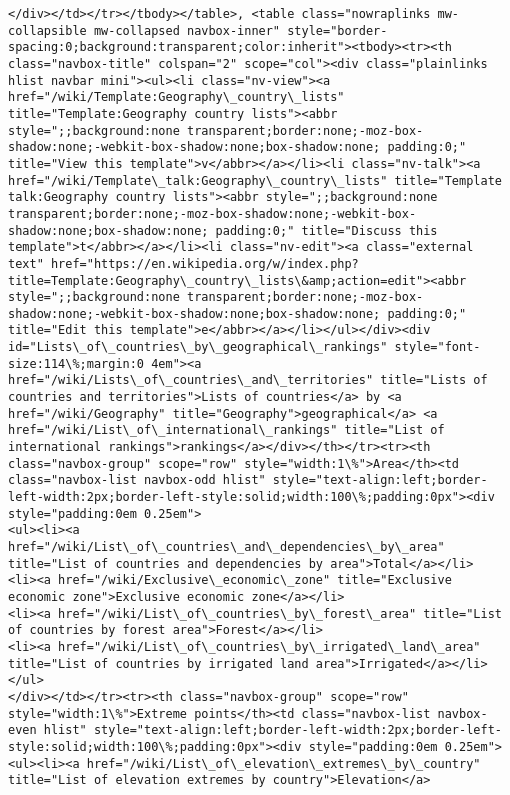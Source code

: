 \documentclass[11pt]{article}
\begin{document}
\begin{Verbatim}[commandchars=\\\{\}]
</div></td></tr></tbody></table>, <table class="nowraplinks mw-collapsible mw-collapsed navbox-inner" style="border-spacing:0;background:transparent;color:inherit"><tbody><tr><th class="navbox-title" colspan="2" scope="col"><div class="plainlinks hlist navbar mini"><ul><li class="nv-view"><a href="/wiki/Template:Geography\_country\_lists" title="Template:Geography country lists"><abbr style=";;background:none transparent;border:none;-moz-box-shadow:none;-webkit-box-shadow:none;box-shadow:none; padding:0;" title="View this template">v</abbr></a></li><li class="nv-talk"><a href="/wiki/Template\_talk:Geography\_country\_lists" title="Template talk:Geography country lists"><abbr style=";;background:none transparent;border:none;-moz-box-shadow:none;-webkit-box-shadow:none;box-shadow:none; padding:0;" title="Discuss this template">t</abbr></a></li><li class="nv-edit"><a class="external text" href="https://en.wikipedia.org/w/index.php?title=Template:Geography\_country\_lists\&amp;action=edit"><abbr style=";;background:none transparent;border:none;-moz-box-shadow:none;-webkit-box-shadow:none;box-shadow:none; padding:0;" title="Edit this template">e</abbr></a></li></ul></div><div id="Lists\_of\_countries\_by\_geographical\_rankings" style="font-size:114\%;margin:0 4em"><a href="/wiki/Lists\_of\_countries\_and\_territories" title="Lists of countries and territories">Lists of countries</a> by <a href="/wiki/Geography" title="Geography">geographical</a> <a href="/wiki/List\_of\_international\_rankings" title="List of international rankings">rankings</a></div></th></tr><tr><th class="navbox-group" scope="row" style="width:1\%">Area</th><td class="navbox-list navbox-odd hlist" style="text-align:left;border-left-width:2px;border-left-style:solid;width:100\%;padding:0px"><div style="padding:0em 0.25em">
<ul><li><a href="/wiki/List\_of\_countries\_and\_dependencies\_by\_area" title="List of countries and dependencies by area">Total</a></li>
<li><a href="/wiki/Exclusive\_economic\_zone" title="Exclusive economic zone">Exclusive economic zone</a></li>
<li><a href="/wiki/List\_of\_countries\_by\_forest\_area" title="List of countries by forest area">Forest</a></li>
<li><a href="/wiki/List\_of\_countries\_by\_irrigated\_land\_area" title="List of countries by irrigated land area">Irrigated</a></li></ul>
</div></td></tr><tr><th class="navbox-group" scope="row" style="width:1\%">Extreme points</th><td class="navbox-list navbox-even hlist" style="text-align:left;border-left-width:2px;border-left-style:solid;width:100\%;padding:0px"><div style="padding:0em 0.25em">
<ul><li><a href="/wiki/List\_of\_elevation\_extremes\_by\_country" title="List of elevation extremes by country">Elevation</a>

\end{Verbatim}
\end{document}

